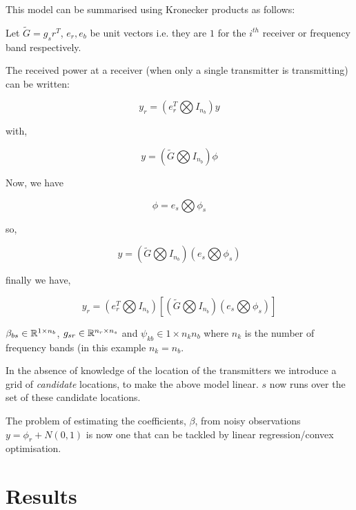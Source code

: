 This model can be summarised using Kronecker products as follows:

Let \(\tilde{G} = g_sr^T\), \(e_r, e_b\) be unit vectors i.e. they are \(1\) for the \(i^{th}\) receiver or frequency band respectively.

The received power at a receiver (when only a single transmitter is transmitting) can be written:

\begin{equation}
y_r = \left(	e_r^T \bigotimes I_{n_b}\right) y
\end{equation}

with,

\begin{equation}
y = \left( \tilde{G} \bigotimes I_{n_b} \right) \phi
\end{equation}

Now, we have

\begin{equation}
\phi = e_s \bigotimes \phi_s
\end{equation}

so,

\begin{equation}
y = \left( \tilde{G} \bigotimes I_{n_b} \right) \left(e_s \bigotimes \phi_s \right)
\end{equation}

finally we have,

\begin{equation}
y_r = \left(	e_r^T \bigotimes I_{n_b}\right)\left[\left( \tilde{G} \bigotimes I_{n_b} \right) \left(e_s \bigotimes \phi_s \right)\right]
\end{equation}

\(\beta_{bs} \in {\mathbb{R}}^{1 \times n_b}\), \(g_{sr} \in {\mathbb{R}}^{n_r \times n_s}\) and \(\psi_{kb} \in 1 \times n_k n_b\) where \(n_k\) is the number of frequency bands (in this example \(n_k = n_b\).

In the absence of knowledge of the location of the transmitters we introduce a grid of \textit{candidate} locations, to make the above model linear. \(s\) now runs over the set of these candidate locations.

The problem of estimating the coefficients, \(\beta\), from noisy observations \(y = \phi_r + N\left(0,1\right)\) is now one that can be tackled by linear regression/convex optimisation.



\section{Results} \label{sec:results}

